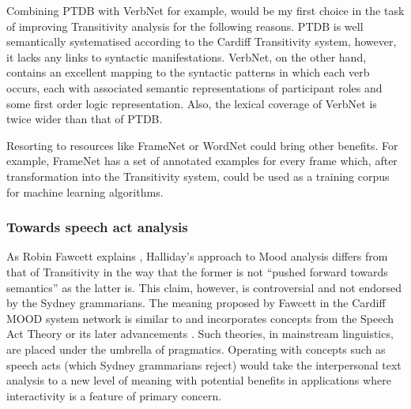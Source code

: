     Combining PTDB with VerbNet for example, would be my first choice in the task of improving Transitivity analysis for the following reasons. PTDB is well semantically systematised according to the Cardiff Transitivity system, however, it lacks any links to syntactic manifestations. VerbNet, on the other hand, contains an excellent mapping to the syntactic patterns in which each verb occurs, each with associated semantic representations of participant roles and some first order logic representation. %
    Also, the lexical coverage of VerbNet is twice wider than that of PTDB. 

    Resorting to resources like FrameNet or WordNet could bring other benefits. For example, FrameNet has a set of annotated examples for every frame which, after transformation into the Transitivity system, could be used as a training corpus for machine learning algorithms. 
    

\subsubsection{Towards speech act analysis}

    As Robin Fawcett explains \citep{Fawcett2011}, Halliday's approach to Mood analysis differs from that of Transitivity in the way that the former is not ``pushed forward towards semantics'' as the latter is. This claim, however, is controversial and not endorsed by the Sydney grammarians. %
    The meaning proposed by Fawcett in the Cardiff MOOD system network is similar to and incorporates concepts from the Speech Act Theory \citep{Austin1975} or its later advancements \citep{Searle1969}. Such theories, in mainstream linguistics, are placed under the umbrella of pragmatics. Operating with concepts such as speech acts (which Sydney grammarians reject) would take the interpersonal text analysis to a new level of meaning with potential benefits in applications where interactivity is a feature of primary concern.
    
